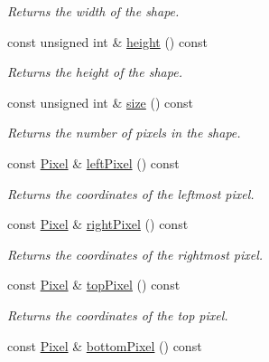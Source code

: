 \begin{CompactItemize}
\begin{CompactList}\small\item\em Returns the width of the shape. \item\end{CompactList}\item 
const unsigned int \& \hyperlink{class_shape_8400155046b2190bce621f8f366ef2be}{height} () const 
\begin{CompactList}\small\item\em Returns the height of the shape. \item\end{CompactList}\item 
const unsigned int \& \hyperlink{class_shape_8504d3be338d2fa594c35fe1444a9ed8}{size} () const 
\begin{CompactList}\small\item\em Returns the number of pixels in the shape. \item\end{CompactList}\item 
const \hyperlink{_shape_8hpp_535e59456e3e633842529cfa8ea103c4}{Pixel} \& \hyperlink{class_shape_53d49d362234068aad0b80986fabb85d}{leftPixel} () const 
\begin{CompactList}\small\item\em Returns the coordinates of the leftmost pixel. \item\end{CompactList}\item 
const \hyperlink{_shape_8hpp_535e59456e3e633842529cfa8ea103c4}{Pixel} \& \hyperlink{class_shape_c265e43fa90ee2ab7c9cd3a3d1e96d82}{rightPixel} () const 
\begin{CompactList}\small\item\em Returns the coordinates of the rightmost pixel. \item\end{CompactList}\item 
const \hyperlink{_shape_8hpp_535e59456e3e633842529cfa8ea103c4}{Pixel} \& \hyperlink{class_shape_063c4934d8c1cd4b02e4e3e4a604f62e}{topPixel} () const 
\begin{CompactList}\small\item\em Returns the coordinates of the top pixel. \item\end{CompactList}\item 
const \hyperlink{_shape_8hpp_535e59456e3e633842529cfa8ea103c4}{Pixel} \& \hyperlink{class_shape_99293804122214fa366d7f7ae794d077}{bottomPixel} () const 

\end{CompactItemize}
